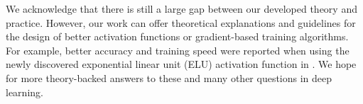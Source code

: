We acknowledge that there is still a large gap between our developed theory and practice. However, our work can offer theoretical explanations and guidelines for the design of better activation functions or gradient-based training algorithms. For example, better accuracy and training speed were reported when using the newly discovered exponential linear unit (ELU) activation function in \cite{ClevertUH15, ShahKSS16}. We hope for more theory-backed answers to these and many other questions in deep learning.



